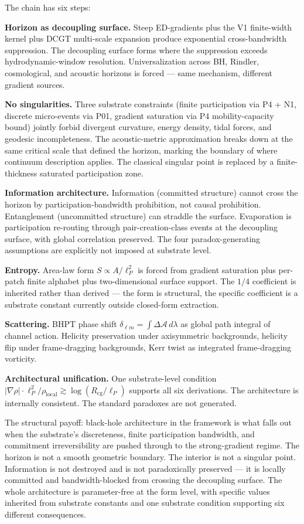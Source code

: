 \documentclass[11pt,a4paper]{article}
\begin{document}
The chain has six steps:

\textbf{Horizon as decoupling surface.} Steep ED-gradients plus the V1 finite-width kernel plus DCGT multi-scale expansion produce exponential cross-bandwidth suppression. The decoupling surface forms where the suppression exceeds hydrodynamic-window resolution. Universalization across BH, Rindler, cosmological, and acoustic horizons is forced --- same mechanism, different gradient sources.

\textbf{No singularities.} Three substrate constraints (finite participation via P4 + N1, discrete micro-events via P01, gradient saturation via P4 mobility-capacity bound) jointly forbid divergent curvature, energy density, tidal forces, and geodesic incompleteness. The acoustic-metric approximation breaks down at the same critical scale that defined the horizon, marking the boundary of where continuum description applies. The classical singular point is replaced by a finite-thickness saturated participation zone.

\textbf{Information architecture.} Information (committed structure) cannot cross the horizon by participation-bandwidth prohibition, not causal prohibition. Entanglement (uncommitted structure) can straddle the surface. Evaporation is participation re-routing through pair-creation-class events at the decoupling surface, with global correlation preserved. The four paradox-generating assumptions are explicitly not imposed at substrate level.

\textbf{Entropy.} Area-law form $S \propto A/\ell_P^2$ is forced from gradient saturation plus per-patch finite alphabet plus two-dimensional surface support. The $1/4$ coefficient is inherited rather than derived --- the form is structural, the specific coefficient is a substrate constant currently outside closed-form extraction.

\textbf{Scattering.} BHPT phase shift $\delta_{\ell m} = \int \Delta\mathcal{A}\, d\lambda$ as global path integral of channel action. Helicity preservation under axisymmetric backgrounds, helicity flip under frame-dragging backgrounds, Kerr twist as integrated frame-dragging vorticity.

\textbf{Architectural unification.} One substrate-level condition $|\nabla\rho| \cdot \ell_P^2/\rho_{\mathrm{local}} \gtrsim \log(R_{\mathrm{cg}}/\ell_P)$ supports all six derivations. The architecture is internally consistent. The standard paradoxes are not generated.

The structural payoff: black-hole architecture in the framework is what falls out when the substrate's discreteness, finite participation bandwidth, and commitment irreversibility are pushed through to the strong-gradient regime. The horizon is not a smooth geometric boundary. The interior is not a singular point. Information is not destroyed and is not paradoxically preserved --- it is locally committed and bandwidth-blocked from crossing the decoupling surface. The whole architecture is parameter-free at the form level, with specific values inherited from substrate constants and one substrate condition supporting six different consequences.
\end{document}
